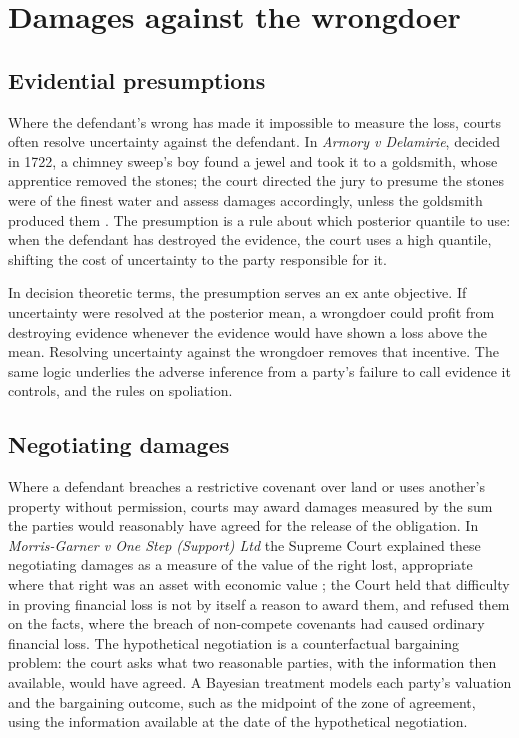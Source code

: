 \section{Damages against the wrongdoer}

\subsection{Evidential presumptions}

Where the defendant's wrong has made it impossible to measure the loss, courts often resolve uncertainty against the defendant. In \emph{Armory v Delamirie}, decided in 1722, a chimney sweep's boy found a jewel and took it to a goldsmith, whose apprentice removed the stones; the court directed the jury to presume the stones were of the finest water and assess damages accordingly, unless the goldsmith produced them \citep{armory1722}. The presumption is a rule about which posterior quantile to use: when the defendant has destroyed the evidence, the court uses a high quantile, shifting the cost of uncertainty to the party responsible for it.

In decision theoretic terms, the presumption serves an ex ante objective. If uncertainty were resolved at the posterior mean, a wrongdoer could profit from destroying evidence whenever the evidence would have shown a loss above the mean. Resolving uncertainty against the wrongdoer removes that incentive. The same logic underlies the adverse inference from a party's failure to call evidence it controls, and the rules on spoliation.

\subsection{Negotiating damages}

Where a defendant breaches a restrictive covenant over land or uses another's property without permission, courts may award damages measured by the sum the parties would reasonably have agreed for the release of the obligation. In \emph{Morris-Garner v One Step (Support) Ltd} the Supreme Court explained these negotiating damages as a measure of the value of the right lost, appropriate where that right was an asset with economic value \citep{morrisgarner2018}; the Court held that difficulty in proving financial loss is not by itself a reason to award them, and refused them on the facts, where the breach of non-compete covenants had caused ordinary financial loss. The hypothetical negotiation is a counterfactual bargaining problem: the court asks what two reasonable parties, with the information then available, would have agreed. A Bayesian treatment models each party's valuation and the bargaining outcome, such as the midpoint of the zone of agreement, using the information available at the date of the hypothetical negotiation.

